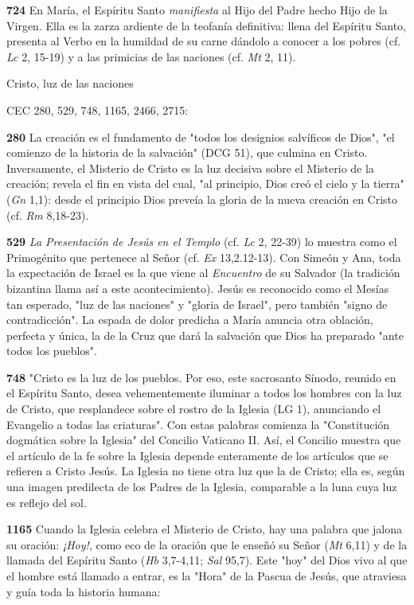 \documentclass[]{article}
\begin{document}
\textbf{724} En María, el Espíritu Santo \emph{manifiesta} al Hijo del
Padre hecho Hijo de la Virgen. Ella es la zarza ardiente de la teofanía
definitiva: llena del Espíritu Santo, presenta al Verbo en la humildad
de su carne dándolo a conocer a los pobres (cf. \emph{Lc} 2, 15-19) y a
las primicias de las naciones (cf. \emph{Mt} 2, 11).

Cristo, luz de las naciones

CEC 280, 529, 748, 1165, 2466, 2715:

\textbf{280} La creación es el fundamento de "todos los designios
salvíficos de Dios", "el comienzo de la historia de la salvación" (DCG
51), que culmina en Cristo. Inversamente, el Misterio de Cristo es la
luz decisiva sobre el Misterio de la creación; revela el fin en vista
del cual, "al principio, Dios creó el cielo y la tierra" (\emph{Gn}
1,1): desde el principio Dios preveía la gloria de la nueva creación en
Cristo (cf. \emph{Rm} 8,18-23).

\textbf{529} \emph{La Presentación de Jesús en el Templo} (cf. \emph{Lc}
2, 22-39) lo muestra como el Primogénito que pertenece al Señor (cf.
\emph{Ex} 13,2.12-13). Con Simeón y Ana, toda la expectación de Israel
es la que viene al \emph{Encuentro} de su Salvador (la tradición
bizantina llama así a este acontecimiento). Jesús es reconocido como el
Mesías tan esperado, "luz de las naciones" y "gloria de Israel", pero
también "signo de contradicción". La espada de dolor predicha a María
anuncia otra oblación, perfecta y única, la de la Cruz que dará la
salvación que Dios ha preparado "ante todos los pueblos".

\textbf{748} "Cristo es la luz de los pueblos. Por eso, este sacrosanto
Sínodo, reunido en el Espíritu Santo, desea vehementemente iluminar a
todos los hombres con la luz de Cristo, que resplandece sobre el rostro
de la Iglesia (LG 1), anunciando el Evangelio a todas las criaturas".
Con estas palabras comienza la "Constitución dogmática sobre la Iglesia"
del Concilio Vaticano II. Así, el Concilio muestra que el artículo de la
fe sobre la Iglesia depende enteramente de los artículos que se refieren
a Cristo Jesús. La Iglesia no tiene otra luz que la de Cristo; ella es,
según una imagen predilecta de los Padres de la Iglesia, comparable a la
luna cuya luz es reflejo del sol.

\textbf{1165} Cuando la Iglesia celebra el Misterio de Cristo, hay una
palabra que jalona su oración: \emph{¡Hoy!}, como eco de la oración que
le enseñó su Señor (\emph{Mt} 6,11) y de la llamada del Espíritu Santo
(\emph{Hb} 3,7-4,11; \emph{Sal} 95,7). Este "hoy" del Dios vivo al que
el hombre está llamado a entrar, es la "Hora" de la Pascua de Jesús, que
atraviesa y guía toda la historia humana:
\end{document}
